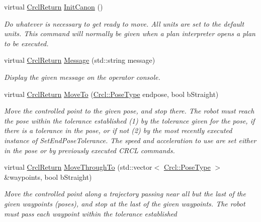 \begin{DoxyCompactItemize}
virtual \hyperlink{namespaceCrcl_a1ed3b29723118a020251dde9b12733c0}{Crcl\-Return} \hyperlink{classCrcl_1_1CrclDelegateInterface_ace91dcb602e1aa5a45bdf8bbcec38391}{Init\-Canon} ()
\begin{DoxyCompactList}\small\item\em Do whatever is necessary to get ready to move. All units are set to the default units. This command will normally be given when a plan interpreter opens a plan to be executed. \end{DoxyCompactList}\item 
virtual \hyperlink{namespaceCrcl_a1ed3b29723118a020251dde9b12733c0}{Crcl\-Return} \hyperlink{classCrcl_1_1CrclDelegateInterface_a24d05f3f6758ff75df04ef4ef6260fae}{Message} (std\-::string message)
\begin{DoxyCompactList}\small\item\em Display the given message on the operator console. \end{DoxyCompactList}\item 
virtual \hyperlink{namespaceCrcl_a1ed3b29723118a020251dde9b12733c0}{Crcl\-Return} \hyperlink{classCrcl_1_1CrclDelegateInterface_ac04c8af185b4465add0654b47d3b4ce3}{Move\-To} (\hyperlink{namespaceCrcl_acc6c82b52280f4d0e74b82a92400956e}{Crcl\-::\-Pose\-Type} endpose, bool b\-Straight)
\begin{DoxyCompactList}\small\item\em Move the controlled point to the given pose, and stop there. The robot must reach the pose within the tolerance established (1) by the tolerance given for the pose, if there is a tolerance in the pose, or if not (2) by the most recently executed instance of Set\-End\-Pose\-Tolerance. The speed and acceleration to use are set either in the pose or by previously executed C\-R\-C\-L commands. \end{DoxyCompactList}\item 
virtual \hyperlink{namespaceCrcl_a1ed3b29723118a020251dde9b12733c0}{Crcl\-Return} \hyperlink{classCrcl_1_1CrclDelegateInterface_a14b31a646c0601b17783156a32f3bac8}{Move\-Through\-To} (std\-::vector$<$ \hyperlink{namespaceCrcl_acc6c82b52280f4d0e74b82a92400956e}{Crcl\-::\-Pose\-Type} $>$ \&waypoints, bool b\-Straight)
\begin{DoxyCompactList}\small\item\em Move the controlled point along a trajectory passing near all but the last of the given waypoints (poses), and stop at the last of the given waypoints. The robot must pass each waypoint within the tolerance established \par

\end{DoxyCompactList}
\end{DoxyCompactItemize}

